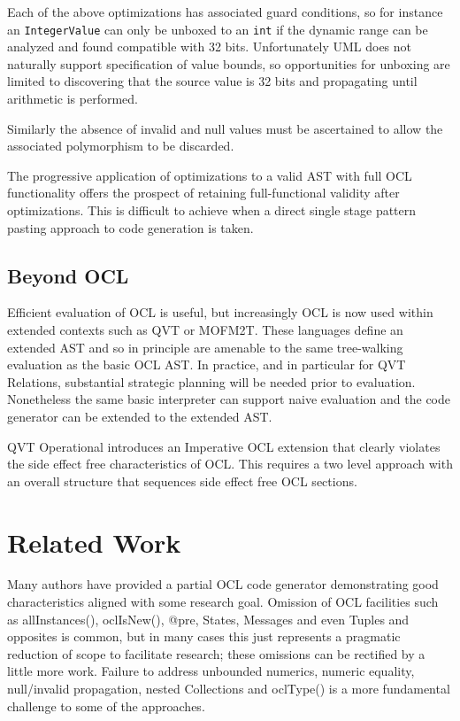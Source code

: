 \documentclass{acm_proc_article-sp}
\begin{document}
Each of the above optimizations has associated guard conditions, so for instance an \verb|IntegerValue| can only be unboxed to an \verb|int| if the dynamic range can be analyzed and found compatible with 32 bits. Unfortunately UML does not naturally support specification of value bounds, so opportunities for unboxing are limited to discovering that the source value is 32 bits and propagating until arithmetic is performed.

Similarly the absence of invalid and null values must be ascertained to allow the associated polymorphism to be discarded.

The progressive application of optimizations to a valid AST with full OCL functionality offers the prospect of retaining full-functional validity after optimizations. This is difficult to achieve when a direct single stage pattern pasting approach to code generation is taken. 

\subsection{Beyond OCL}

Efficient evaluation of OCL is useful, but increasingly OCL is now used within extended contexts such as QVT\cite{QVT-1.1} or MOFM2T\cite{MOFM2T}.
These languages define an extended AST and so in principle are amenable to the same tree-walking evaluation as the basic OCL AST. In practice, and in particular for QVT Relations, substantial strategic planning will be needed prior to evaluation. Nonetheless the same basic interpreter can support naive evaluation and the code generator can be extended to the extended AST.

QVT Operational introduces an Imperative OCL extension that clearly violates the side effect free characteristics of OCL.
This requires a two level approach with an overall structure that sequences side effect free
OCL sections.  

\section{Related Work}

Many authors have provided a partial OCL code generator demonstrating good characteristics aligned with some research goal. Omission of OCL facilities such as allInstances(), oclIsNew(), @pre, States, Messages and even Tuples and opposites is common, but in many cases this just represents a pragmatic reduction of scope to facilitate research; these omissions can be rectified by a little more work. Failure to address unbounded numerics, numeric equality, null/invalid propagation, nested Collections and oclType() is a more fundamental challenge to some of the approaches. 
\end{document}

